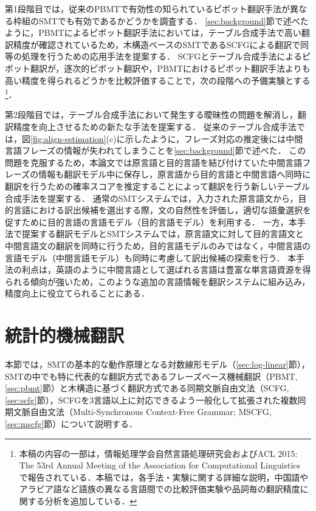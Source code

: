 \documentclass[japanese]{jnlp_1.4}
\makeatletter
\newcommand\footnoteref[1]{\protected@xdef\@thefnmark{\ref{#1}}\@footnotemark}
\makeatother
\begin{document}
第1段階目では，従来のPBMTで有効性の知られているピボット翻訳手法が異なる枠組のSMTでも有効であるかどうかを調査する．
\ref{sec:background}節で述べたように，PBMTによるピボット翻訳手法においては，テーブル合成手法で高い翻訳精度が確認されているため，木構造ベースのSMTであるSCFGによる翻訳で同等の処理を行うための応用手法を提案する．
SCFGとテーブル合成手法によるピボット翻訳が，逐次的ピボット翻訳や，PBMTにおけるピボット翻訳手法よりも高い精度を得られるどうかを比較評価することで，次の段階への予備実験とする\footnote{\label{fn:papers}
本稿の内容の一部は，情報処理学会自然言語処理研究会\cite{miura14nl12,miura15nl07}およびACL 2015: The 53rd Annual Meeting of the Association for Computational Linguistics \cite{miura15acl}で報告されている．本稿では，各手法・実験に関する詳細な説明，中国語やアラビア語など語族の異なる言語間での比較評価実験や品詞毎の翻訳精度に関する分析を追加している．
}．

第2段階目では，テーブル合成手法において発生する曖昧性の問題を解消し，翻訳精度を向上させるための新たな手法を提案する．
従来のテーブル合成手法では，図\ref{fig:align-estimation}(c)に示したように，フレーズ対応の推定後には中間言語フレーズの情報が失われてしまうことを\ref{sec:background}節で述べた．
この問題を克服するため，本論文では原言語と目的言語を結び付けていた中間言語フレーズの情報も翻訳モデル中に保存し，原言語から目的言語と中間言語へ同時に翻訳を行うための確率スコアを推定することによって翻訳を行う新しいテーブル合成手法を提案する．
通常のSMTシステムでは，入力された原言語文から，目的言語における訳出候補を選出する際，文の自然性を評価し，適切な語彙選択を促すために目的言語の言語モデル（目的言語モデル）を利用する．
一方，本手法で提案する翻訳モデルとSMTシステムでは，原言語文に対して目的言語文と中間言語文の翻訳を同時に行うため，目的言語モデルのみではなく，中間言語の言語モデル（中間言語モデル）も同時に考慮して訳出候補の探索を行う．
本手法の利点は，英語のように中間言語として選ばれる言語は豊富な単言語資源を得られる傾向が強いため，このような追加の言語情報を翻訳システムに組み込み，精度向上に役立てられることにある\footnoteref{fn:papers}．


\section{統計的機械翻訳}
\label{sec:smt}

本節では，SMTの基本的な動作原理となる対数線形モデル（\ref{sec:log-linear}節），SMTの中でも特に代表的な翻訳方式であるフレーズベース機械翻訳（PBMT, \ref{sec:pbmt}節）と木構造に基づく翻訳方式である同期文脈自由文法（SCFG, \ref{sec:scfg}節），SCFGを3言語以上に対応できるよう一般化して拡張された複数同期文脈自由文法（Multi-Synchronous Context-Free Grammar; MSCFG, \ref{sec:mscfg}節）について説明する．
\end{document}
